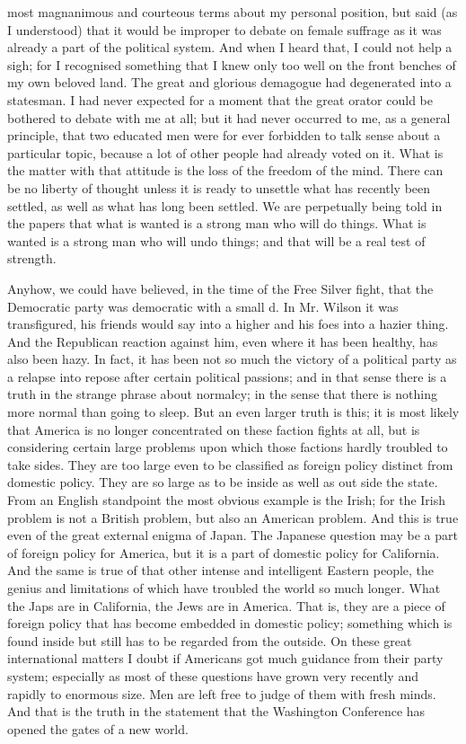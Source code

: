 \documentclass{book}
\begin{document}
most magnanimous and courteous terms about my personal position, but said (as I understood) that it would be improper to debate on female suffrage as it was already a part of the political system. And when I heard that, I could not help a sigh; for I recognised something that I knew only too well on the front benches of my own beloved land. The great and glorious demagogue had degenerated into a statesman. I had never expected for a moment that the great orator could be bothered to debate with me at all; but it had never occurred to me, as a general principle, that two educated men were for ever forbidden to talk sense about a particular topic, because a lot of other people had already voted on it. What is the matter with that attitude is the loss of the freedom of the mind. There can be no liberty of thought unless it is ready to unsettle what has recently been settled, as well as what has long been settled. We are perpetually being told in the papers that what is wanted is a strong man who will do things. What is wanted is a strong man who will undo things; and that will be a real test of strength.

Anyhow, we could have believed, in the time of the Free Silver fight, that the Democratic party was democratic with a small d. In Mr. Wilson it was transfigured, his friends would say into a higher and his foes into a hazier thing. And the Republican reaction against him, even where it has been healthy, has also been hazy. In fact, it has been not so much the victory of a political party as a relapse into repose after certain political passions; and in that sense there is a truth in the strange phrase about normalcy; in the sense that there is nothing more normal than going to sleep. But an even larger truth is this; it is most likely that America is no longer concentrated on these faction fights at all, but is considering certain large problems upon which those factions hardly troubled to take sides. They are too large even to be classified as foreign policy distinct from domestic policy. They are so large as to be inside as well as out side the state. From an English standpoint the most obvious example is the Irish; for the Irish problem is not a British problem, but also an American problem. And this is true even of the great external enigma of Japan. The Japanese question may be a part of foreign policy for America, but it is a part of domestic policy for California. And the same is true of that other intense and intelligent Eastern people, the genius and limitations of which have troubled the world so much longer. What the Japs are in California, the Jews are in America. That is, they are a piece of foreign policy that has become embedded in domestic policy; something which is found inside but still has to be regarded from the outside. On these great international matters I doubt if Americans got much guidance from their party system; especially as most of these questions have grown very recently and rapidly to enormous size. Men are left free to judge of them with fresh minds. And that is the truth in the statement that the Washington Conference has opened the gates of a new world.
\end{document}
